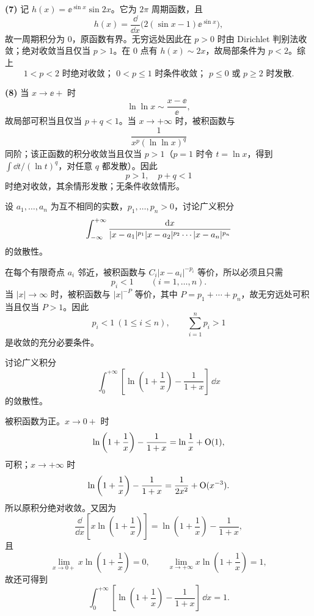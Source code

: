 \begin{xsolution}
\textbf{(7)} 记 $h(x)=\ee^{\sin x}\sin2x$。它为 $2\pi$ 周期函数，且
\[
  h(x)=\frac{\dd}{\dd x}\bigl(2(\sin x-1)\ee^{\sin x}\bigr),
\]
故一周期积分为 $0$，原函数有界。无穷远处因此在 $p>0$ 时由 Dirichlet 判别法收敛；绝对收敛当且仅当 $p>1$。在 $0$ 点有 $h(x)\sim2x$，故局部条件为 $p<2$。综上
\[
  \boxed{1<p<2\text{ 时绝对收敛； }0<p\leq1\text{ 时条件收敛； }p\leq0\text{ 或 }p\geq2\text{ 时发散}.}
\]

\textbf{(8)} 当 $x\to\ee+$ 时
\[
  \ln\ln x\sim\frac{x-\ee}{\ee},
\]
故局部可积当且仅当 $p+q<1$。当 $x\to+\infty$ 时，被积函数与
\[
  \frac1{x^p(\ln\ln x)^q}
\]
同阶；该正函数的积分收敛当且仅当 $p>1$（$p=1$ 时令 $t=\ln x$，得到 $\int\dd t/(\ln t)^q$，对任意 $q$ 都发散）。因此
\[
  \boxed{p>1,\quad p+q<1}
\]
时绝对收敛，其余情形发散；无条件收敛情形。
\end{xsolution}


\begin{xexercise}[3]
设 $a_1,\ldots,a_n$ 为互不相同的实数，$p_1,\ldots,p_n>0$，讨论广义积分
  \[
    \int_{-\infty}^{+\infty}\frac{\mathop{}\!\mathrm{d} x}{\lvert x-a_1\rvert^{p_1}\lvert x-a_2\rvert^{p_2}\cdots\lvert x-a_n\rvert^{p_n}}
  \]
  的敛散性。
\end{xexercise}
\begin{xsolution}
在每个有限奇点 $a_i$ 邻近，被积函数与 $C_i|x-a_i|^{-p_i}$ 等价，所以必须且只需
\[
  p_i<1\qquad(i=1,\ldots,n).
\]
当 $|x|\to\infty$ 时，被积函数与 $|x|^{-P}$ 等价，其中 $P=p_1+\cdots+p_n$，故无穷远处可积当且仅当 $P>1$。因此
\[
  \boxed{p_i<1\ (1\leq i\leq n),\qquad \sum_{i=1}^n p_i>1}
\]
是收敛的充分必要条件。
\end{xsolution}


\begin{xexercise}[4]
讨论广义积分
  \[
    \int_0^{+\infty}\left[\ln\left(1+\frac1x\right)-\frac1{1+x}\right]\,\dd x
  \]
  的敛散性。
\end{xexercise}
\begin{xsolution}
被积函数为正。$x\to0+$ 时
\[
  \ln\left(1+\frac1x\right)-\frac1{1+x}
  =\ln\frac1x+\mathrm{O}(1),
\]
可积；$x\to+\infty$ 时
\[
  \ln\left(1+\frac1x\right)-\frac1{1+x}
  =\frac1{2x^2}+\mathrm{O}(x^{-3}).
\]
所以原积分绝对收敛。又因为
\[
  \frac{\dd}{\dd x}\left[x\ln\left(1+\frac1x\right)\right]
  =\ln\left(1+\frac1x\right)-\frac1{1+x},
\]
且
\[
  \lim_{x\to0+}x\ln\left(1+\frac1x\right)=0,
  \qquad
  \lim_{x\to+\infty}x\ln\left(1+\frac1x\right)=1,
\]
故还可得到
\[
  \int_0^{+\infty}\left[\ln\left(1+\frac1x\right)-\frac1{1+x}\right]\,\dd x=\boxed{1}.
\]
\end{xsolution}


